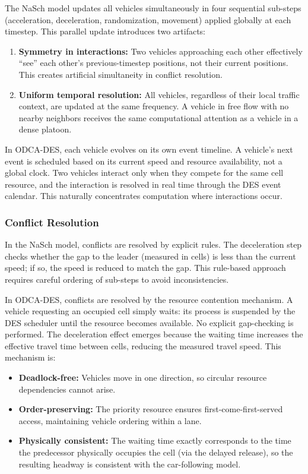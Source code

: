 \documentclass[review,number]{elsarticle}
\begin{document}
The NaSch model updates all vehicles simultaneously in four sequential sub-steps (acceleration, deceleration, randomization, movement) applied globally at each timestep. This parallel update introduces two artifacts:
\begin{enumerate}
    \item \textbf{Symmetry in interactions:} Two vehicles approaching each other effectively ``see'' each other's previous-timestep positions, not their current positions. This creates artificial simultaneity in conflict resolution.
    \item \textbf{Uniform temporal resolution:} All vehicles, regardless of their local traffic context, are updated at the same frequency. A vehicle in free flow with no nearby neighbors receives the same computational attention as a vehicle in a dense platoon.
\end{enumerate}

In ODCA-DES, each vehicle evolves on its own event timeline. A vehicle's next event is scheduled based on its current speed and resource availability, not a global clock. Two vehicles interact only when they compete for the same cell resource, and the interaction is resolved in real time through the DES event calendar. This naturally concentrates computation where interactions occur.

\subsubsection{Conflict Resolution}

In the NaSch model, conflicts are resolved by explicit rules. The deceleration step checks whether the gap to the leader (measured in cells) is less than the current speed; if so, the speed is reduced to match the gap. This rule-based approach requires careful ordering of sub-steps to avoid inconsistencies.

In ODCA-DES, conflicts are resolved by the resource contention mechanism. A vehicle requesting an occupied cell simply waits: its process is suspended by the DES scheduler until the resource becomes available. No explicit gap-checking is performed. The deceleration effect emerges because the waiting time increases the effective travel time between cells, reducing the measured travel speed. This mechanism is:
\begin{itemize}
    \item \textbf{Deadlock-free:} Vehicles move in one direction, so circular resource dependencies cannot arise.
    \item \textbf{Order-preserving:} The priority resource ensures first-come-first-served access, maintaining vehicle ordering within a lane.
    \item \textbf{Physically consistent:} The waiting time exactly corresponds to the time the predecessor physically occupies the cell (via the delayed release), so the resulting headway is consistent with the car-following model.
\end{itemize}
\end{document}
